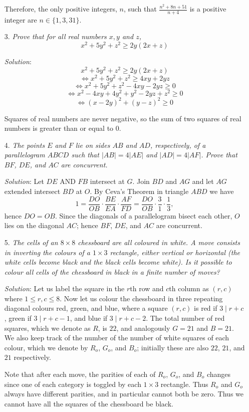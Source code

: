 \documentclass{article}
\begin{document}
\begin{enumerate}[1.]
Therefore, the only positive integers, $n$, such that $\frac{n^2 + 8n + 51}{n + 4}$ is a positive integer are $n \in \{1, 3, 31\}.$


\item[3.] %
\textit{Prove that for all real numbers $x, y$ and $z$,
$$x^2 + 5y^2 + z^2 \ge 2y(2x + z)$$}

\textit{Solution}:
$$x^2 + 5y^2 + z^2 \ge 2y(2x + z)$$
$$\iff x^2 + 5y^2 + z^2 \ge 4xy + 2yz$$
$$\iff x^2 + 5y^2 + z^2 - 4xy - 2yz \ge 0$$
$$\iff x^2 - 4xy + 4y^2 + y^2 - 2yz + z^2 \ge 0$$
$$\iff (x - 2y)^2 + (y - z)^2 \ge 0$$

Squares of real numbers are never negative, so the sum of two squares of real numbers is greater than or equal to 0.



\item[4.] %
\textit{The points $E$ and $F$ lie on sides $AB$ and $AD$, respectively, of a parallelogram $ABCD$ such that $|AB| = 4|AE|$ and $|AD| = 4|AF|$.
Prove that $BF$, $DE$, and $AC$ are concurrent.}

\textit{Solution}:
Let $DE$ AND $FB$ intersect at $G$.
Join $BD$ and $AG$ and let $AG$ extended intersect $BD$ at $O$.
By Ceva's Theorem in triangle $ABD$ we have
\[ 1 = \frac{DO}{OB} \cdot \frac{BE}{EA} \cdot \frac{AF}{FD} = \frac{DO}{OB} \cdot \frac{3}{1} \cdot \frac{1}{3}, \]
hence $DO = OB$.
Since the diagonals of a parallelogram bisect each other, $O$ lies on the diagonal $AC$; hence $BF$, $DE$, and $AC$ are concurrent.
\vspace{6.81mm}


\item[5.] %
\textit{The cells of an $8 \times 8$ chessboard are all coloured in white. A move consists in inverting the colours of a $1 \times 3$ rectangle, either vertical or horizontal (the white cells become black and the black cells become white).
Is it possible to colour all cells of the chessboard in black in a finite number of moves?}

\textit{Solution}: 
Let us label the square in the $r$th row and $c$th column as $(r,c)$ where $1 \leq r,c \leq 8$.
Now let us colour the chessboard in three repeating diagonal colours red, green, and blue, where a square $(r,c)$ is red if $3 \mid r+c$, green if $3 \mid r+c-1$, and blue if $3 \mid r+c-2$.
The total number of red squares, which we denote as $R$, is $22$, and analogously $G = 21$ and $B = 21$.
We also keep track of the number of the number of white squares of each colour, which we denote by $R_o$, $G_o$, and $B_o$; initially these are also $22$, $21$, and $21$ respectively.

Note that after each move, the parities of each of $R_o$, $G_o$, and $B_o$ changes since one of each category is toggled by each $1 \times 3$ rectangle.
Thus $R_o$ and $G_o$ always have different parities, and in particular cannot both be zero.
Thus we cannot have all the squares of the chessboard be black.


\end{enumerate}
\end{document}
